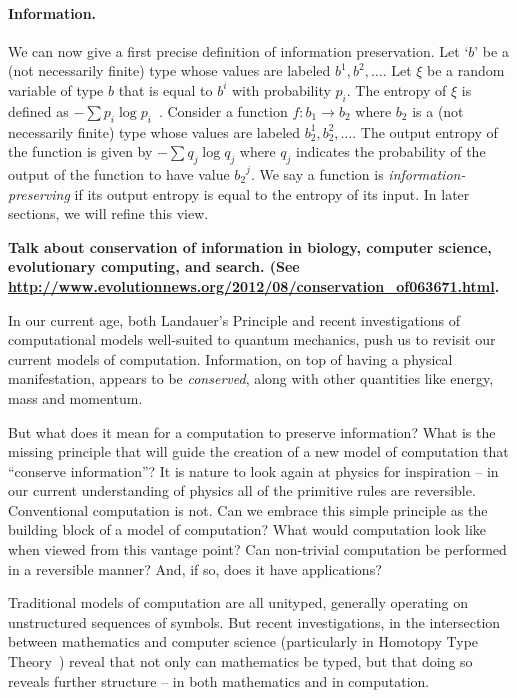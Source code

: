 \documentclass{article}
\newcommand{\amr}[1]{\fbox{Amr says:} \textbf{#1}}
\begin{document}
\paragraph*{Information.}
We can now give a first precise definition of information preservation.
Let
`$b$' be a (not necessarily finite) type whose values are labeled
$b^1, b^2, \ldots$. Let $\xi$ be a random variable of type $b$ that is
equal to $b^i$ with probability $p_i$. The entropy of $\xi$ is defined
as $-\sum p_i \log{p_i}$~\cite{Shannon1948}.  Consider a function
$f : b_1 \rightarrow b_2$ where $b_2$ is a (not necessarily finite)
type whose values are labeled $b_2^1, b_2^2, \ldots$. The output
entropy of the function is given by $- \sum q_j \log{q_j}$ where $q_j$
indicates the probability of the output of the function to have value
${b_2}^j$. We say a function is \emph{information-preserving} if its
output entropy is equal to the entropy of its input. In later sections,
we will refine this view.

\amr{
Talk about conservation of information in biology, computer science,
evolutionary computing, and search. (See
\url{http://www.evolutionnews.org/2012/08/conservation_of063671.html}.
}

In our current age, both Landauer's Principle and recent investigations
of computational models well-suited to quantum mechanics, push us to
revisit our current models of computation. Information, on top of
having a physical manifestation, appears to be \emph{conserved},
along with other quantities like energy, mass and momentum.

But what does it mean for a computation to preserve information?
What is the missing principle that will guide the creation of a new
model of computation that ``conserve information''?
It is nature to look again at physics for inspiration --
in our current understanding of physics all of the primitive rules
are reversible. Conventional computation is not. Can
we embrace this simple principle as the building block of a model of
computation? What would computation look like when viewed from this
vantage point? Can non-trivial computation be performed in a
reversible manner? And, if so, does it have applications?

Traditional models of computation are all unityped, generally
operating on unstructured sequences of symbols. But recent
investigations, in the intersection between mathematics and
computer science (particularly in Homotopy Type Theory~\cite{hottbook})
reveal that not only can mathematics be typed, but that doing so
reveals further structure -- in both mathematics and in computation.
\end{document}
